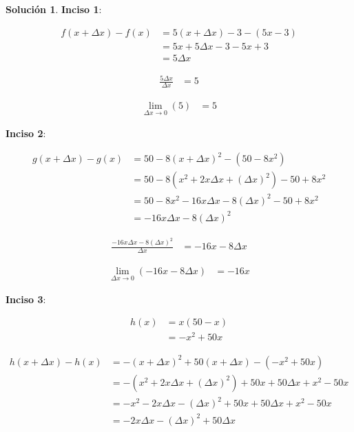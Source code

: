 \documentclass{article}
\theoremstyle{definition}
\newtheorem*{solution}{Solución}
\begin{document}
\begin{solution}

\textbf{Inciso 1}:

    \begin{align*}
        f(x+\Delta x) - f(x) &= 5(x+\Delta x)-3-(5x-3) \\
        &= 5x+5\Delta x-3-5x+3 \\
        &= 5\Delta x
    \end{align*}

    \begin{align*}
        \frac{5\Delta x}{\Delta x} &= 5
    \end{align*}

    \begin{align*}
        \lim_{\Delta x \to 0} (5) &= 5
    \end{align*}

\textbf{Inciso 2}:

    \begin{align*}
        g(x+\Delta x) - g(x) &= 50-8(x+\Delta x)^2-(50-8x^2) \\
        &= 50-8(x^2+2x\Delta x+(\Delta x)^2)-50+8x^2 \\
        &= 50-8x^2-16x\Delta x-8(\Delta x)^2-50+8x^2 \\
        &= -16x\Delta x-8(\Delta x)^2
    \end{align*}

    \begin{align*}
        \frac{-16x\Delta x-8(\Delta x)^2}{\Delta x} &= -16x-8\Delta x
    \end{align*}

    \begin{align*}
        \lim_{\Delta x \to 0} (-16x-8\Delta x) &= -16x
    \end{align*}

\textbf{Inciso 3}:

    \begin{align*}
        h(x) &= x(50-x) \\
        &= -x^2+50x
    \end{align*}

    \begin{align*}
        h(x+\Delta x) - h(x) &= -(x+\Delta x)^2+50(x+\Delta x)-(-x^2+50x) \\
        &= -(x^2+2x\Delta x+(\Delta x)^2)+50x+50\Delta x+x^2-50x \\
        &= -x^2-2x\Delta x-(\Delta x)^2+50x+50\Delta x+x^2-50x \\
        &= -2x\Delta x-(\Delta x)^2+50\Delta x
    \end{align*}


\end{solution}
\end{document}
